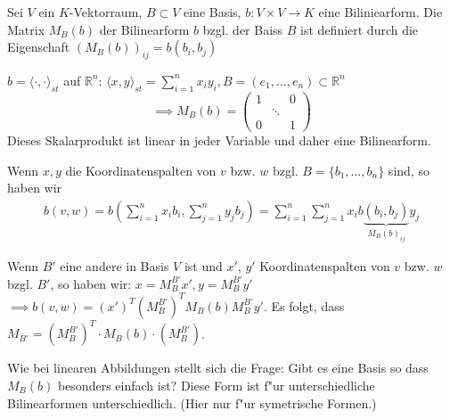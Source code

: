 \documentclass[oneside,fontsize=11pt,paper=a4,BCOR=0mm,DIV=12,automark,headsepline]{scrbook}
\newcommand{\gq}[1]{\glqq{}#1\grqq{}} %
\theoremstyle{remark}
\theoremstyle{definition}
\theoremstyle{definition}
\theoremstyle{remark}
\begin{document}
\begin{definition}{}{}
  Sei $V$ ein $K$-Vektorraum, $B\subset V$ eine Basis, \(b: V\times V\to K\) eine Biliniearform.
  Die Matrix $M_B(b)$ der Bilinearform $b$ bzgl. der Baiss $B$ ist definiert
  durch die Eigenschaft $(M_B(b))_{ij}=b(b_i, b_j)$
\end{definition}
\begin{exa}
  \(b = \langle\cdot , \cdot\rangle_{st}\) auf \(\mathbb{R}^n\): \(\langle x, y\rangle_{st} = \sum_{i=1}^nx_i y_i, B = (e_1, \dots, e_n)\subset \mathbb{R}^n\) \[\implies M_B(b) =
    \begin{pmatrix}
      1 & & 0 \\
      &\ddots & \\
      0 & & 1
    \end{pmatrix}
  \] Dieses Skalarprodukt ist linear in jeder Variable und daher eine Bilinearform.
\end{exa}
Wenn $x,y$ die Koordinatenspalten von $v$ bzw. $w$ bzgl. $B = \{b_1,\dots, b_n\}$ sind, so haben wir
\begin{align*}
  b(v,w) = b\left(\sum_{i=1}^nx_ib_i, \sum_{j=1}^ny_jb_j\right) = \sum_{i=1}^n\sum_{j=1}^nx_ib\underbrace{(b_i, b_j)}_{M_B(b)_{ij}}y_j
\end{align*}

Wenn $B'$ eine andere in Basis $V$ ist und $x'$, $y'$ Koordinatenspalten von $v$
bzw. $w$ bzgl. $B'$, so haben wir: $x=M_{B}^{B'}x', y = M_{B}^{B'}y'$  $\implies b(v,w)= (x')^T(M_B^{B'})^TM_B(b)M_B^{B'}y'$. Es
folgt, dass $M_{B'}= (M^{B'}_{B})^T\cdot M_B(b)\cdot (M^{B'}_{B})$.

Wie bei linearen Abbildungen stellt sich die Frage: \gq{Gibt es eine Basis so dass
  $M_B(b)$ besonders einfach ist?} Diese Form ist f"ur unterschiedliche
Bilinearformen unterschiedlich. (Hier nur f"ur symetrische Formen.)
\end{document}
